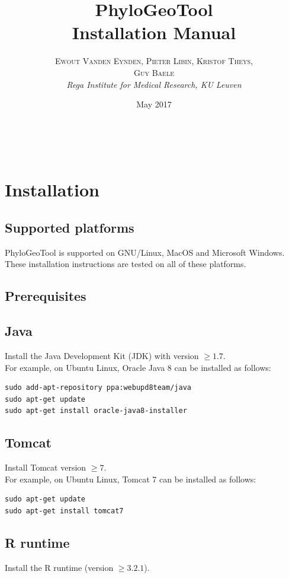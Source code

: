 \documentclass[a4paper, 11pt]{article} %
\title{\textbf{PhyloGeoTool}\\ %
Installation Manual} %
\author{\textsc{Ewout Vanden Eynden, Pieter Libin, Kristof Theys, \\{Guy Baele}} %
\\{\textit{Rega Institute for Medical Research, KU Leuven}}} %
\date{May 2017} %
\makeatletter
\renewcommand{\maketitle}{ %
\begin{flushright} %
{\LARGE\@title} %

\vspace{50pt} %

{\large\@author} %
\\\@date %

\vspace{40pt} %
\end{flushright}
}
\makeatother
\begin{document}
\maketitle %

\vspace{30pt} %

\tableofcontents
\newpage

\section{Installation}

\subsection{Supported platforms}
PhyloGeoTool is supported on GNU/Linux, MacOS and Microsoft Windows. These installation instructions are tested on all of these platforms.

\subsection{Prerequisites}
\subsection*{Java}
Install the Java Development Kit (JDK) with version $\geq 1.7$.\\

\noindent For example, on Ubuntu Linux, Oracle Java 8 can be installed as follows:
\begin{verbatim} 
sudo add-apt-repository ppa:webupd8team/java
sudo apt-get update
sudo apt-get install oracle-java8-installer
\end{verbatim}

\subsection*{Tomcat}
Install Tomcat version $\geq 7$.\\

\noindent For example, on Ubuntu Linux, Tomcat 7 can be installed as follows:
\begin{verbatim}
sudo apt-get update
sudo apt-get install tomcat7
\end{verbatim}

\subsection*{R runtime}
Install the R runtime (version $\geq 3.2.1$).\\
\end{document}
